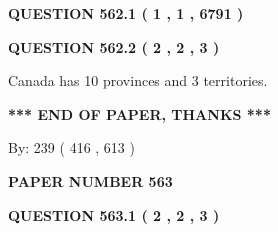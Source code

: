 \documentclass[12pt]{article}
\begin{document}
   
   
   
 \vspace{0.2in}
 
 
 
 
   
   
  
\vspace{0.2in}
  
{\textbf{\Large{QUESTION
562.1 
 ( 1 , 1 , 6791 )
}}}
  
  
  
\vspace{0.2in}
  
{\textbf{\Large{QUESTION
562.2 
 ( 2 , 2 , 3 )
}}}
  
  
 
 
\noindent{}
 
 
Canada has 10  provinces and 3 territories.
 
 
 
 
   
   
 \vspace{0.2in}
 
   
   
   
   
\vspace{1.0in} 
{\textbf{\large{ *** END OF PAPER, THANKS *** }}} 
   
   
\hspace{1.0in} By: 
 239 ( 416 ,  613 )
   
   
   
   
\newpage 
\setcounter{page}{ 
   563001 } 
   
   
   
   
 {\textbf{ \Large{ PAPER NUMBER  563  }}}
   
   
\vspace{0.2in}
   
   
   
   
   
   
 \vspace{0.2in}
 
 
 
 
   
   
  
\vspace{0.2in}
  
{\textbf{\Large{QUESTION
563.1 
 ( 2 , 2 , 3 )
}}}
  
\end{document}
